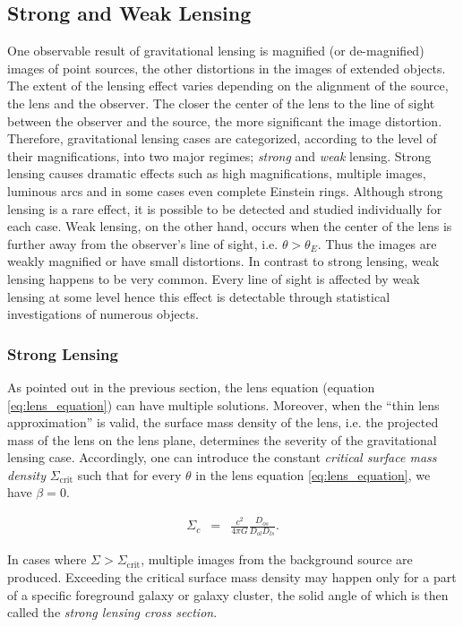 \documentclass[paper=a4, fontsize=11pt]{scrartcl} %
\numberwithin{equation}{section} %
\numberwithin{figure}{section} %
\numberwithin{table}{section} %
\begin{document}
 \subsection{Strong and Weak Lensing}
One observable result of gravitational lensing is magnified (or de-magnified) images of point sources, the other distortions in the images of extended objects. The extent of the lensing effect varies depending on the alignment of the source, the lens and the observer. The closer the center of the lens to the line of sight between the observer and the source, the more significant the image distortion. Therefore, gravitational lensing cases are categorized, according to the level of their magnifications, into two major regimes; \emph{strong} and \emph{weak} lensing. Strong lensing causes dramatic effects such as high magnifications, multiple images, luminous arcs and in some cases even complete Einstein rings. Although strong lensing is a rare effect, it is possible to be detected and studied individually for each case. Weak lensing, on the other hand, occurs when the center of the lens is further away from the observer's line of sight, i.e. $\theta > \theta_E$. Thus the images are weakly magnified or have small distortions. In contrast to strong lensing, weak lensing happens to be very common. Every line of sight is affected by weak lensing at some level hence this effect is detectable through statistical investigations of numerous objects. 

\subsubsection{Strong Lensing}
As pointed out in the previous section, the lens equation (equation \ref{eq:lens_equation}) can have multiple solutions. Moreover, when the ``thin lens approximation'' is valid, the surface mass density of the lens, i.e. the projected mass of the lens on the lens plane, determines the severity of the gravitational lensing case. Accordingly, one can introduce the constant \emph{critical surface mass density} $\Sigma_{\mathrm{crit}}$ such that for every $\theta$ in the lens equation \ref{eq:lens_equation}, we have $\beta = 0$.

\begin{eqnarray}
\label{eq:Sigma_crit}
 \Sigma_c &=& \frac{c^2}{4 \pi G}\frac{D_{os}}{D_{ol} D_{ls}}.
\end{eqnarray}

In cases where $\Sigma > \Sigma_{\mathrm{crit}}$, multiple images from the background source are produced. Exceeding the critical surface mass density may happen only for a part of a specific foreground galaxy or galaxy cluster, the solid angle of which is then called the \emph{strong lensing cross section}. 
\end{document}
